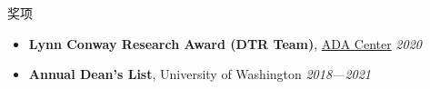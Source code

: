 \documentclass{resume}
\begin{document}
	\begin{rSection}{奖项}
		\begin{itemize}
			\setlength{\itemsep}{1pt}
			\setlength{\parskip}{0pt}
			\setlength{\parsep}{0pt}
			\item \textbf{Lynn Conway Research Award (DTR Team)}, \href{https://adacenter.org}{ADA Center} \hfill {\em 2020}
			\item \textbf{Annual Dean's List}, University of Washington \hfill {\em 2018---2021}
		\end{itemize}
	\end{rSection}
\end{document}
